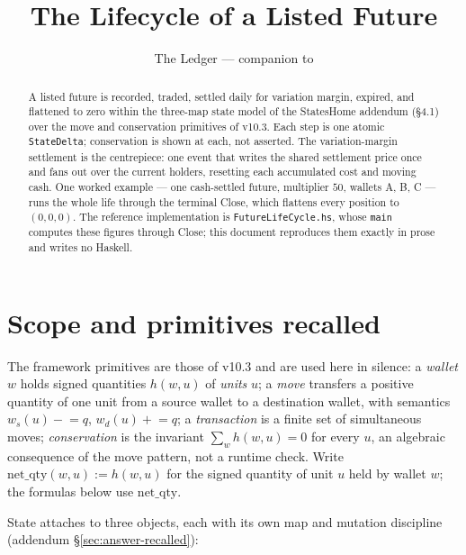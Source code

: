 \documentclass[11pt]{article}
\title{The Lifecycle of a Listed Future}
\author{The Ledger --- companion to \code{FutureLifeCycle.hs}}
\date{}
\newcommand{\netq}{\mathrm{net\_qty}}
\newcommand{\code}[1]{\texttt{#1}}
\begin{document}
\maketitle

\begin{abstract}
\noindent A listed future is recorded, traded, settled daily for variation margin, expired, and flattened to
zero within the three-map state model of the StatesHome addendum (\S4.1) over the move and
conservation primitives of v10.3. Each step is one atomic \code{StateDelta}; conservation is shown
at each, not asserted. The variation-margin settlement is the centrepiece: one event that writes the
shared settlement price once and fans out over the current holders, resetting each accumulated cost
and moving cash. One worked example --- one cash-settled future, multiplier $50$, wallets A, B, C
--- runs the whole life through the terminal Close, which flattens every position to $(0,0,0)$. The
reference implementation is \code{FutureLifeCycle.hs}, whose \code{main} computes these figures
through Close; this document reproduces them exactly in prose and writes no Haskell.
\end{abstract}

\section{Scope and primitives recalled}

The framework primitives are those of v10.3 and are used here in silence: a \emph{wallet} $w$ holds
signed quantities $h(w,u)$ of \emph{units} $u$; a \emph{move} transfers a positive quantity of one
unit from a source wallet to a destination wallet, with semantics $w_s(u)\mathrel{-}=q$,
$w_d(u)\mathrel{+}=q$; a \emph{transaction} is a finite set of simultaneous moves;
\emph{conservation} is the invariant $\sum_{w}h(w,u)=0$ for every $u$, an algebraic consequence of
the move pattern, not a runtime check. Write $\netq(w,u):=h(w,u)$ for the signed quantity of unit
$u$ held by wallet $w$; the formulas below use $\netq$.

State attaches to three objects, each with its own map and mutation discipline
(addendum \S\ref{sec:answer-recalled}):
\end{document}
